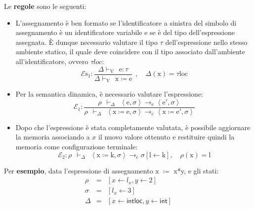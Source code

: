 \documentclass[a4paper]{article}
\begin{document}
 	\noindent
 	Le \textbf{regole} sono le seguenti:
 	\begin{itemize}
 		\item L'assegnamento è ben formato se l'identificatore a sinistra del simbolo di assegnamento è un identificatore variabile e se è del tipo dell'espressione assegnata. È dunque necessario valutare il tipo $\tau$ dell'espressione nello stesso ambiente statico, il quale deve coincidere con il tipo associato dall'ambiente all'identificatore, ovvero $\tau loc$:
 		\begin{equation*}
 			\mathcal{E}\mathrm{s}_{1} : \dfrac{
 				\Delta \vdash_{\mathrm{V}} \:\: \mathrm{e} : \tau
 			}{
 				\Delta \vdash_{\mathrm{V}} \:\: \mathrm{x} \coloneq \mathrm{e}
 			} \:\: , \hspace{1em} \Delta\left(\mathrm{x}\right) = \tau \mathrm{loc}
 		\end{equation*}
 		
 		\item Per la semantica dinamica, è necessario valutare l'espressione:
 		\begin{equation*}
 			\mathcal{E}_{1} : \dfrac{
 				\rho \:\: \vdash_{\Delta} \:\: \left\langle \mathrm{e}, \sigma \right\rangle \rightarrow_{\mathrm{e}} \left\langle \mathrm{e}', \sigma \right\rangle
 			}{
 				\rho \:\: \vdash_{\Delta} \:\: \left\langle \mathrm{x} \coloneq \mathrm{e}, \sigma \right\rangle \rightarrow_{\mathrm{c}} \left\langle \mathrm{x} \coloneq \mathrm{e}', \sigma \right\rangle
 			}
 		\end{equation*}
 		
 		\item Dopo che l'espressione è stata completamente valutata, è possibile aggiornare la memoria associando a $x$ il nuovo valore ottenuto e restituire quindi la memoria come configurazione terminale:
 		\begin{equation*}
 			\mathcal{E}_{2} : \rho \:\: \vdash_{\Delta} \:\: \left\langle \mathrm{x} \coloneq \mathrm{k}, \sigma \right\rangle \rightarrow_{\mathrm{c}} \sigma\left[\mathrm{l} \leftarrow \mathrm{k}\right], \hspace{1em} \rho\left(\mathrm{x}\right) = \mathrm{l}
 		\end{equation*}
 	\end{itemize}
 	Per \textcolor{Green4}{\textbf{esempio}}, data l'espressione di assegnamento \textsf{x $\coloneq$ x*y}, e gli stati:
 	\begin{equation*}
 		\begin{array}{lll}
 			\rho	& = & \left[x \leftarrow l_{x}, y \leftarrow 2 \right] \\
 			\sigma	& = & \left[l_{x} \leftarrow 3\right] \\
 			\Delta	& = & \left[x \leftarrow \mathsf{intloc}, y \leftarrow \textsf{int}\right]
 		\end{array}
 	\end{equation*}
\end{document}
